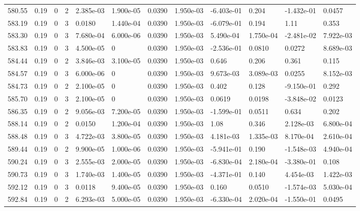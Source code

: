 \documentclass[preview]{standalone}
\begin{document}
{{{{{{{{{{{{{{{{{{\begin{tabular}{L{1.2cm}C{1.2cm} C{0.3cm}C{0.5cm} C{1.4cm}C{1.4cm} C{1.4cm}C{1.4cm} C{1.6cm}C{1.6cm} C{1.6cm}C{1.6cm}}
  580.55  &  0.19  & 0     &  2 &  2.385e-03  & 1.900e-05  &  0.0390&   1.950e-03& -6.403e-01 & 0.204   &  -1.432e-01 & 0.0457  \\ 
  583.19  &  0.19  & 0     &  3 &  0.0180  & 1.440e-04  &  0.0390&   1.950e-03& -6.079e-01 & 0.194   &  1.11 & 0.353  \\ 
  583.30  &  0.19  & 0     &  3 &  7.680e-04  & 6.000e-06  &  0.0390&   1.950e-03& 5.490e-04 & 1.750e-04   &  -2.481e-02 & 7.922e-03  \\ 
  583.83  &  0.19  & 0     &  3 &  4.500e-05  & 0  &  0.0390&   1.950e-03& -2.536e-01 & 0.0810   &  0.0272 & 8.689e-03  \\ 
  584.44  &  0.19  & 0     &  2 &  3.846e-03  & 3.100e-05  &  0.0390&   1.950e-03& 0.646 & 0.206   &  0.361 & 0.115  \\ 
  584.57  &  0.19  & 0     &  3 &  6.000e-06  & 0  &  0.0390&   1.950e-03& 9.673e-03 & 3.089e-03   &  0.0255 & 8.152e-03  \\ 
  584.73  &  0.19  & 0     &  2 &  2.100e-05  & 0  &  0.0390&   1.950e-03& 0.402 & 0.128   &  -9.150e-01 & 0.292  \\ 
  585.70  &  0.19  & 0     &  3 &  2.100e-05  & 0  &  0.0390&   1.950e-03& 0.0619 & 0.0198   &  -3.848e-02 & 0.0123  \\ 
  586.35  &  0.19  & 0     &  2 &  9.056e-03  & 7.200e-05  &  0.0390&   1.950e-03& -1.599e-01 & 0.0511   &  0.634 & 0.202  \\ 
  588.14  &  0.19  & 0     &  2 &  0.0150  & 1.200e-04  &  0.0390&   1.950e-03& 1.08 & 0.346   &  2.128e-03 & 6.800e-04  \\ 
  588.48  &  0.19  & 0     &  3 &  4.722e-03  & 3.800e-05  &  0.0390&   1.950e-03& 4.181e-03 & 1.335e-03   &  8.170e-04 & 2.610e-04  \\ 
  589.44  &  0.19  & 0     &  2 &  9.900e-05  & 1.000e-06  &  0.0390&   1.950e-03& -5.941e-01 & 0.190   &  -1.548e-03 & 4.940e-04  \\ 
  590.24  &  0.19  & 0     &  3 &  2.555e-03  & 2.000e-05  &  0.0390&   1.950e-03& -6.830e-04 & 2.180e-04   &  -3.380e-01 & 0.108  \\ 
  590.73  &  0.19  & 0     &  3 &  1.740e-03  & 1.400e-05  &  0.0390&   1.950e-03& -4.371e-01 & 0.140   &  4.454e-03 & 1.422e-03  \\ 
  592.12  &  0.19  & 0     &  3 &  0.0118  & 9.400e-05  &  0.0390&   1.950e-03& 0.160 & 0.0510   &  -1.574e-03 & 5.030e-04  \\ 
  592.84  &  0.19  & 0     &  2 &  6.293e-03  & 5.000e-05  &  0.0390&   1.950e-03& -6.330e-04 & 2.020e-04   &  -1.550e-01 & 0.0495  \\ 

\end{tabular}}}}}}}}}}}}}}}}}}}
\end{document}
